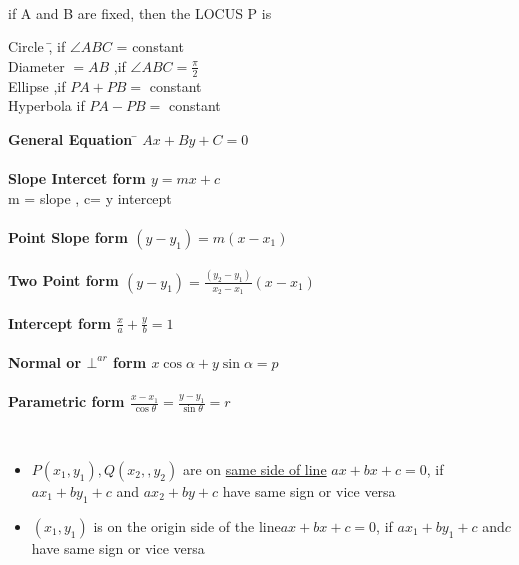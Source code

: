 \documentclass[11pt,a4paper,landscape]{article}
\begin{document}
\pagebreak
%
%
%
%
%
%
\begin{multicols*}{3}
{\bfseries {}}\\
if A and B are fixed, then the LOCUS P is
\begin{tabbing}
Circle \hspace{20mm}\=, if $\angle ABC $ = constant \\
Diameter $= AB$ \>,if $\angle ABC = \frac{\pi}{2}$ \\
Ellipse \>,if $PA + PB =$ constant\\
Hyperbola \> if $PA - PB = $ constant\\
\end{tabbing}
%
%
%
{\bfseries {}}
\begin{tabbing}
{\bfseries {General Equation }}\hspace{5mm} \= $Ax+By+C=0$\\ \\
{\bfseries {Slope Intercet form }}\hspace{5mm} \> $y = mx+c$\\
\> m = slope , c= y intercept \\ \\
{\bfseries {Point Slope form }}\> $(y-y_1)= m(x-x_1)$\\ \\
{\bfseries {Two Point form }}\> $(y-y_1)= \frac{(y_2-y_1)}{x_2-x_1}(x-x_1)$\\ \\
{\bfseries {Intercept form }}\> $\frac{x}{a}+\frac{y}{b}=1$\\ \\
{\bfseries {Normal or $\bot^{ar}$ form }}\> $x\cos\alpha + y\sin\alpha = p$\\ \\
{\bfseries {Parametric form }}\> $\frac{x-x_1}{\cos\theta} = \frac{y-y_1}{\sin\theta}= r$\\
\end{tabbing}
%
%
%
{\bfseries {}}\\
\begin{itemize}
	\item $P(x_1,y_1) , Q(x_2,,y_2)$ are on \underline{same side of line} $ax+bx+c=0$, if $ax_1+by_1+c$ and $ax_2+by+c$ have same sign or vice versa
	\item $(x_1,y_1)$ is on the origin side of the line$ax+bx+c=0$, if $ax_1+by_1+c$ and$c$ have same sign or vice versa 
\end{itemize}

\end{multicols*}
\end{document}

